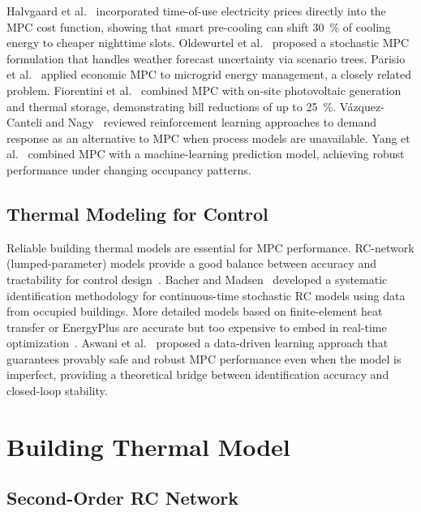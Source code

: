 \documentclass[conference,a4paper]{IEEEtran}[2015/08/26]
\begin{document}
Halvgaard et al.~\cite{Halvgaard2012} incorporated time-of-use
electricity prices directly into the MPC cost function, showing that
smart pre-cooling can shift \SI{30}{\percent} of cooling energy to
cheaper nighttime slots. Oldewurtel et al.~\cite{Oldewurtel2010}
proposed a stochastic MPC formulation that handles weather forecast
uncertainty via scenario trees. Parisio et al.~\cite{Parisio2014}
applied economic MPC to microgrid energy management, a closely related
problem. Fiorentini et al.~\cite{Fiorentini2019} combined MPC with
on-site photovoltaic generation and thermal storage, demonstrating
bill reductions of up to \SI{25}{\percent}. V{\'a}zquez-Canteli and
Nagy~\cite{Vazquez2019} reviewed reinforcement learning approaches
to demand response as an alternative to MPC when process models are
unavailable. Yang et al.~\cite{Yang2015} combined MPC with a
machine-learning prediction model, achieving robust performance under
changing occupancy patterns.

\subsection{Thermal Modeling for Control}

Reliable building thermal models are essential for MPC performance.
RC-network (lumped-parameter) models provide a good balance between
accuracy and tractability for control design~\cite{Bacher2011}.
Bacher and Madsen~\cite{Bacher2011} developed a systematic
identification methodology for continuous-time stochastic RC models
using data from occupied buildings. More detailed models based on
finite-element heat transfer or EnergyPlus are accurate but too
expensive to embed in real-time optimization~\cite{Underwood2014}.
Aswani et al.~\cite{Aswani2012} proposed a data-driven learning
approach that guarantees provably safe and robust MPC performance even
when the model is imperfect, providing a theoretical bridge between
identification accuracy and closed-loop stability.

\section{Building Thermal Model}
\label{sec:model}

\subsection{Second-Order RC Network}
\end{document}
